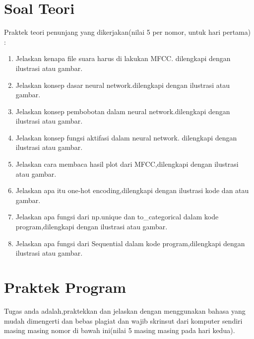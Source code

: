 \section{Soal Teori}
Praktek teori penunjang yang dikerjakan(nilai 5 per nomor, untuk hari pertama) :
\begin{enumerate}
\item
Jelaskan kenapa file suara harus di lakukan MFCC. dilengkapi dengan ilustrasi atau gambar.
\item
Jelaskan konsep dasar neural network.dilengkapi dengan ilustrasi atau gambar.
\item
Jelaskan konsep pembobotan dalam neural network.dilengkapi dengan ilustrasi atau gambar.
\item
Jelaskan konsep fungsi aktifasi dalam neural network. dilengkapi dengan ilustrasi atau gambar.
\item
Jelaskan cara membaca hasil plot dari MFCC,dilengkapi dengan ilustrasi atau gambar.
\item
Jelaskan apa itu one-hot encoding,dilengkapi dengan ilustrasi kode dan atau gambar.
\item
Jelaskan apa fungsi dari np.unique dan to\_categorical dalam kode program,dilengkapi dengan ilustrasi atau gambar.
\item
Jelaskan apa fungsi dari Sequential dalam kode program,dilengkapi dengan ilustrasi atau gambar.
\end{enumerate}



\section{Praktek Program}
Tugas anda adalah,praktekkan dan jelaskan dengan menggunakan bahasa yang mudah dimengerti dan bebas plagiat dan wajib skrinsut dari komputer sendiri masing masing nomor di bawah ini(nilai 5 masing masing pada hari kedua).

